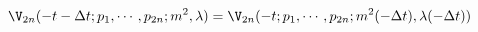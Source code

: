 \begin{equation}
\V_{2n} (-t-\Delta t; p_1,\cdots,p_{2n}; m^2, \lambda) = \V_{2n} (-t;
p_1,\cdots, p_{2n}; m^2 (-\Delta t), \lambda (-\Delta t)) \label{scaling}
\end{equation}

